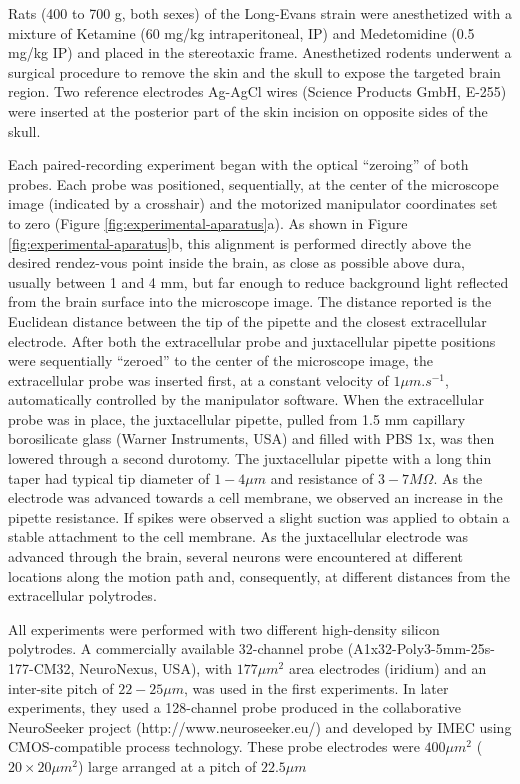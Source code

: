 Rats (400 to 700 g, both sexes) of the Long-Evans strain were anesthetized with a mixture of Ketamine (60 mg/kg intraperitoneal, IP) and Medetomidine (0.5 mg/kg IP) and placed in the stereotaxic frame. Anesthetized rodents underwent a surgical procedure to remove the skin and the skull to expose the targeted brain region. Two reference electrodes Ag-AgCl wires (Science Products GmbH, E-255) were inserted at the posterior part of the skin incision on opposite sides of the skull.

Each paired-recording experiment began with the optical “zeroing” of both probes. Each probe was positioned, sequentially, at the center of the microscope image (indicated by a crosshair) and the motorized manipulator coordinates set to zero (Figure \ref{fig:experimental-aparatus}a). As shown in Figure \ref{fig:experimental-aparatus}b, this alignment is performed directly above the desired rendez-vous point inside the brain, as close as possible above dura, usually between 1 and 4 mm, but far enough to reduce background light reflected from the brain surface into the microscope image. The distance reported is the Euclidean distance between the tip of the pipette and the closest extracellular electrode. After both the extracellular probe and juxtacellular pipette positions were sequentially “zeroed” to the center of the microscope image, the extracellular probe was inserted first, at a constant velocity of $1 \mu m.s^{-1}$, automatically controlled by the manipulator software. When the extracellular probe was in place, the juxtacellular pipette, pulled from 1.5 mm capillary borosilicate glass (Warner Instruments, USA) and filled with PBS 1x, was then lowered through a second durotomy. The juxtacellular pipette with a long thin taper had typical tip diameter of $1-4 \mu m$ and resistance of $3-7 M\Omega$. As the electrode was advanced towards a cell membrane, we observed an increase in the pipette resistance. If spikes were observed a slight suction was applied to obtain a stable attachment to the cell membrane. As the juxtacellular electrode was advanced through the brain, several neurons were encountered at different locations along the motion path and, consequently, at different distances from the extracellular polytrodes.

All experiments were performed with two different high-density silicon polytrodes. A commercially available 32-channel probe (A1x32-Poly3-5mm-25s-177-CM32, NeuroNexus, USA), with $177 \mu m^2$ area electrodes (iridium) and an inter-site pitch of $22-25 \mu m$, was used in the first experiments. In later experiments, they used a 128-channel probe produced in the collaborative NeuroSeeker project (http://www.neuroseeker.eu/) and developed by IMEC using CMOS-compatible process technology. These probe electrodes were $400 \mu m^2$ ($20 \times 20 \mu m^2$) large arranged at a pitch of $22.5 \mu m$

